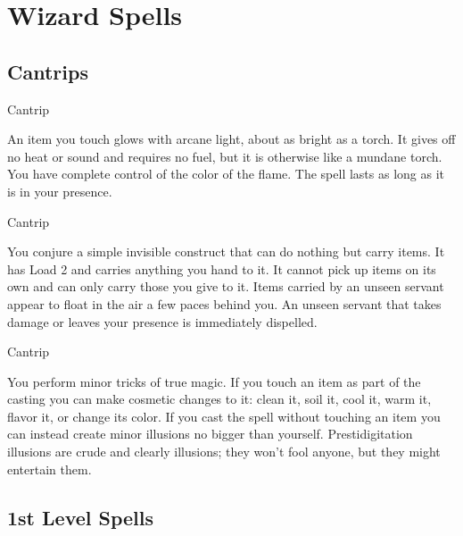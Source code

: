        

                
\section{Wizard Spells}    
     

       
\subsection{Cantrips}   
       
\startSpellName
          	Cantrip
\stopSpellName
       

An item you touch glows with arcane light, about as bright as a torch. It gives off no heat or sound and requires no fuel, but it is otherwise like a mundane torch. You have complete control of the color of the flame. The spell lasts as long as it is in your presence.

       
\startSpellName
          	Cantrip
\stopSpellName
       

You conjure a simple invisible construct that can do nothing but carry items. It has Load 2 and carries anything you hand to it. It cannot pick up items on its own and can only carry those you give to it. Items carried by an unseen servant appear to float in the air a few paces behind you. An unseen servant that takes damage or leaves your presence is immediately dispelled.

       
\startSpellName
          	Cantrip
\stopSpellName
       

You perform minor tricks of true magic. If you touch an item as part of the casting you can make cosmetic changes to it: clean it, soil it, cool it, warm it, flavor it, or change its color. If you cast the spell without touching an item you can instead create minor illusions no bigger than yourself. Prestidigitation illusions are crude and clearly illusions; they won't fool anyone, but they might entertain them.

     

     

       
\subsection{1st Level Spells}     
       
